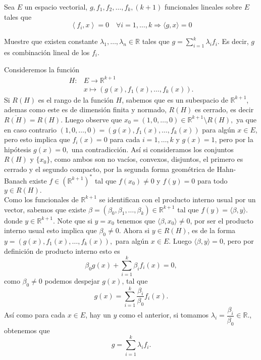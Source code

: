  Sea $E$ un espacio vectorial, $g, f_1, f_2, \ldots, f_k,(k+1)$ funcionales lineales sobre $E$ tales que
$$
\left\langle f_i, x\right\rangle=0 \quad \forall i=1, \ldots, k \Longrightarrow\langle g, x\rangle=0
$$

Muestre que existen constante $\lambda_1, \ldots, \lambda_n \in \mathbb{R}$ tales que $g=\sum_{i=1}^k \lambda_i f_i$. Es decir, $g$ es combinación lineal de los $f_i$.
\begin{sproof}
    Consideremos la función
    \begin{align*}
        H:&E\to \mathbb{R}^{k+1}\\
        &x\mapsto(g(x),f_1(x),\ldots,f_k(x)).
    \end{align*}
    Si $R(H)$ es el rango de la función $H$, sabemos que es un subespacio de $\mathbb{R}^{k+1}$, ademas como este es de dimensión finita y normado, $R(H)$ es cerrado, es decir $\overline{R(H)}=R(H).$ Luego observe que $x_0=(1,0,\ldots,0)\in \mathbb{R}^{k+1}\setminus R(H),$ ya que en caso contrario $(1,0,\ldots,0)=(g(x),f_1(x),\ldots,f_k(x))$ para algún $x\in E$, pero esto implica que $f_i(x)=0$ para cada $i=1,\ldots,k$ y $g(x)=1$, pero por la hipótesis $g(x)=0,$ una contradicción. Así si consideramos los conjuntos $R(H)$ y $\{x_0\}$, como ambos son no vacíos, convexos, disjuntos, el primero es cerrado y el segundo compacto, por la segunda forma geométrica de Hahn-Banach existe $f\in (\mathbb{R}^{k+1})^*$ tal que $f(x_0)\neq 0$ y $f(y)=0$ para todo $y\in R(H).$\\

    Como los funcionales de $\mathbb{R}^{k+1}$ se identifican con el producto interno usual por un vector, sabemos que existe $\beta=(\beta_0,\beta_1,\ldots,\beta_k)\in \mathbb{R}^{k+1}$ tal que $f(y)=\langle \beta,y\rangle.$ donde $y\in \mathbb{R}^{k+1}.$ Note que si $y=x_0$ tenemos que $\langle \beta,x_0\rangle\neq 0$, por ser el producto interno usual esto implica que $\beta_0\neq 0.$ Ahora si $y\in R(H)$, es de la forma $y=(g(x),f_1(x),\ldots,f_k(x)),$ para algún $x\in E.$ Luego $\langle \beta,y\rangle=0$, pero por definición de producto interno esto es 
    $$\beta_0g(x)+\sum_{i=1}^k\beta_if_i(x)=0,$$
    como $\beta_0\neq 0$ podemos despejar $g(x)$, tal que
    $$g(x)=\sum_{i=1}^k\frac{\beta_i}{\beta_0}f_i(x).$$
    Así como para cada $x\in E$, hay un $y$ como el anterior, si tomamos $\lambda_i=\dfrac{\beta_i}{\beta_0}\in \mathbb{R}.$, obtenemos que
    $$g=\sum_{i=1}^k \lambda_i f_i.$$
\end{sproof}